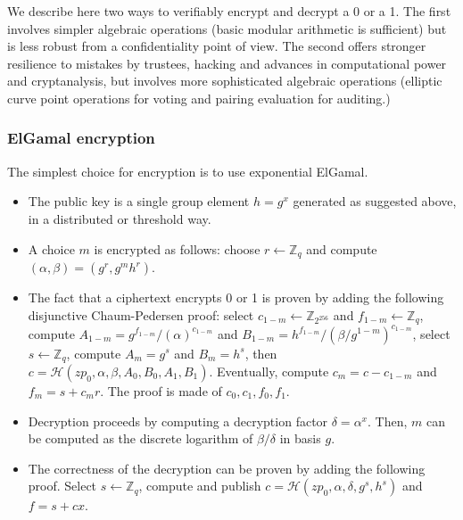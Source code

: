 \documentclass[prodmode]{acmsmall}
\newcommand{\zp}{\ensuremath{zp}\xspace}
\newcommand{\hash}{\ensuremath{\mathcal{H}}\xspace} %
\begin{document}
We describe here two ways to verifiably encrypt and decrypt a 0 or a
1. The first involves simpler algebraic operations (basic modular
arithmetic is sufficient) but is less robust from a confidentiality
point of view. The second offers stronger resilience to mistakes by
trustees, hacking and advances in computational power and
cryptanalysis, but involves more sophisticated algebraic operations
(elliptic curve point operations for voting and pairing evaluation for
auditing.)

\subsubsection{ElGamal encryption}
\label{sec:elgamal-encryption}

The simplest choice for encryption is to use exponential ElGamal. 
\begin{itemize}
\item The public key is a single group element $h = g^x$ generated as
suggested above, in a distributed or threshold way.
\item A choice $m$ is encrypted as follows: choose $r \leftarrow
\mathbb{Z}_q$ and compute $(\alpha, \beta) = (g^r, g^mh^r)$.
\item The fact that a ciphertext encrypts 0 or 1 is proven by adding
the following disjunctive Chaum-Pedersen proof: select $c_{1-m}
\leftarrow \mathbb{Z}_{2^{256}}$ and $f_{1-m} \leftarrow
\mathbb{Z}_q$, compute $A_{1-m} = g^{f_{1-m}}/(\alpha)^{c_{1-m}}$ and
$B_{1-m} = h^{f_{1-m}}/(\beta/g^{1-m})^{c_{1-m}}$, select $s
\leftarrow \mathbb{Z}_q$, compute $A_m = g^s$ and $B_m = h^s$, then $c
= \hash(\zp_0, \alpha, \beta, A_0, B_0, A_1, B_1)$. Eventually,
compute $c_m = c - c_{1-m}$ and $f_m = s + c_mr$. The proof is made of
$c_0, c_1, f_0, f_1$.
\item Decryption proceeds by computing a decryption factor $\delta =
\alpha^x$. Then, $m$ can be computed as the discrete logarithm of
$\beta/\delta$ in basis $g$.
\item The correctness of the decryption can be proven by adding the
following proof. Select $s \leftarrow \mathbb{Z}_q$, compute and
publish $c = \hash(\zp_0, \alpha, \delta, g^s, h^s)$ and $f = s
+ cx$.
\end{itemize}
\end{document}
